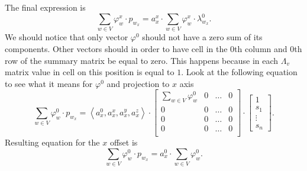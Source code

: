 The final expression is
\begin{equation*}
  \sum\limits_{w \in V} \varphi_w^x \cdot p_{w_x}
  = a_x^x \cdot \sum\limits_{w \in V} \varphi_w^x \cdot \lambda^0_{w_x}.
\end{equation*}
We should notice that only vector $\varphi^0$
should not have a zero sum of its components.
Other vectors should in order to have cell in the $0$th column and $0$th row
of the summary matrix be equal to zero.
This happens because in each $\Lambda_v$ matrix value in cell on this position
is equal to $1$.
Look at the following equation to see what it means for $\varphi^0$
and projection to $x$ axis
\begin{equation*}
  \sum\limits_{w \in V} \varphi_w^0 \cdot p_{w_x}
  = \left\langle a^0_x, a_x^x, a_x^y, a_x^z \right\rangle
    \cdot \begin{bmatrix}
      \sum\limits_{w \in V} \varphi_w^0 & 0 & \dots & 0 \\
      0                                 & 0 & \dots   & 0 \\
      0                                 & 0 & \dots & 0 \\
      0                                 & 0 & \dots & 0 \\
    \end{bmatrix}
    \cdot \begin{bmatrix}
      1 \\
      s_1 \\
      \vdots \\
      s_n
    \end{bmatrix}.
\end{equation*}
Resulting equation for the $x$ offset is
\begin{equation*}
  \sum\limits_{w \in V} \varphi_w^0 \cdot p_{w_x}
  = a^0_x \cdot \sum\limits_{w \in V} \varphi_w^0.
\end{equation*}

